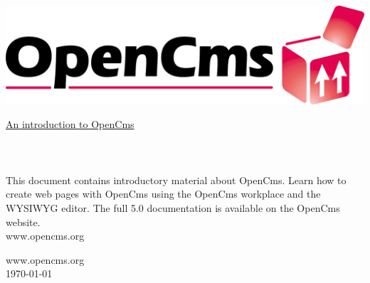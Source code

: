 
\begin{titlepage}
\begin{flushright}
  \includegraphics[width=0.4\linewidth]{pics/logo}
\end{flushright}
\vspace{8cm}
\Huge
\titleFont \underline{An introduction to OpenCms}\\
\\
\\
\normalsize
\\
This document contains introductory material about OpenCms.
Learn how to create web pages with OpenCms using the OpenCms workplace and the WYSIWYG editor.
The full 5.0 documentation is available on the OpenCms website.\\
\vfill
www.opencms.org
\end{titlepage}

\newpage
\thispagestyle{empty}
\vspace*{\fill}
www.opencms.org\\
\today

